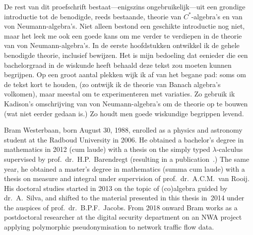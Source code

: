 \documentclass[b5paper]{book}
\begin{document}
De rest van dit proefschrift bestaat---enigszins ongebruikelijk---uit 
een grondige introductie
tot de benodigde, reeds bestaande, theorie
van $C^*$-algebra's en van von Neumann-algebra's.
Niet alleen bestond
een geschikte introductie nog niet, maar het leek me ook een goede kans 
om me verder te verdiepen in de theorie van von Neumann-algebra's.
In de eerste hoofdstukken ontwikkel ik de gehele benodigde theorie, inclusief 
bewijzen.
Het is mijn bedoeling dat eenieder die een bachelorgraad in de wiskunde heeft 
behaald deze tekst zou moeten kunnen begrijpen.
Op een groot aantal plekken wijk ik af van 
het begane pad:
soms om de tekst kort te houden, (zo ontwijk ik de
theorie van Banach algebra's volkomen),
maar meestal om te experimenteren met variaties.
Zo gebruik ik Kadison's omschrijving
van von Neumann-algebra's om
de theorie op te bouwen (wat niet eerder gedaan is.)
Zo houdt men goede wiskundige begrippen levend.

Bram Westerbaan, born August 30, 1988,
enrolled as a physics and astronomy student at 
the Radboud University in 2006.
He obtained a bachelor's degree in mathematics in 2012 (cum laude)
with a thesis
on the simply typed $\lambda$-calculus
supervised by prof.~dr.~H.P.~Barendregt
(resulting in a publication~\cite{brambachelor}.)
The same year,
he obtained a master's degree in mathematics (summa cum laude)
with a thesis\cite{brammaster} on measure and integral
under supervision of prof.~dr.~A.C.M.~van Rooij.
His doctoral studies started in 2013
on the topic of (co)algebra guided by dr.~A.~Silva,
and shifted 
to the material presented in this thesis
in~2014
under the auspices of prof.~dr.~B.P.F.~Jacobs.
From 2018 onward Bram works as a postdoctoral researcher
at the digital security department on
an NWA project applying polymorphic pseudonymisation
to network traffic flow data.
\end{document}
